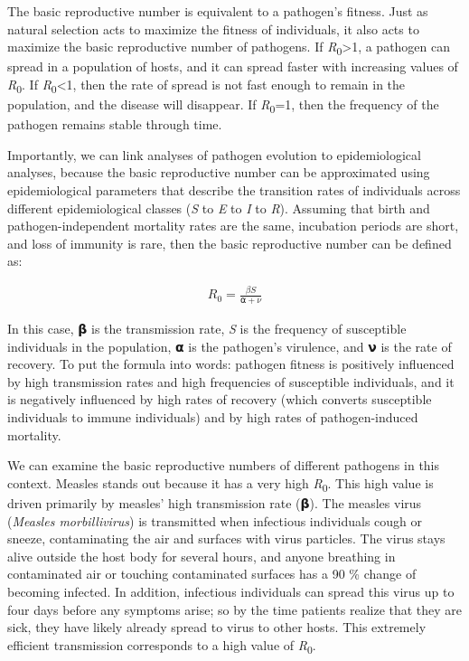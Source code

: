 \documentclass[
]{book}
\begin{document}
The basic reproductive number is equivalent to a pathogen's fitness. Just as natural selection acts to maximize the fitness of individuals, it also acts to maximize the basic reproductive number of pathogens. If \emph{R}\textsubscript{0}\textgreater1, a pathogen can spread in a population of hosts, and it can spread faster with increasing values of \emph{R}\textsubscript{0}. If \emph{R}\textsubscript{0}\textless1, then the rate of spread is not fast enough to remain in the population, and the disease will disappear. If \emph{R}\textsubscript{0}=1, then the frequency of the pathogen remains stable through time.

Importantly, we can link analyses of pathogen evolution to epidemiological analyses, because the basic reproductive number can be approximated using epidemiological parameters that describe the transition rates of individuals across different epidemiological classes (\emph{S} to \emph{E} to \emph{I} to \emph{R}). Assuming that birth and pathogen-independent mortality rates are the same, incubation periods are short, and loss of immunity is rare, then the basic reproductive number can be defined as:

\begin{align} 
R_0=\frac{βS}{⍺+ν} \label{eq:47}
\end{align}

In this case, 𝝱 is the transmission rate, \emph{S} is the frequency of susceptible individuals in the population, 𝝰 is the pathogen's virulence, and 𝝼 is the rate of recovery. To put the formula into words: pathogen fitness is positively influenced by high transmission rates and high frequencies of susceptible individuals, and it is negatively influenced by high rates of recovery (which converts susceptible individuals to immune individuals) and by high rates of pathogen-induced mortality.

We can examine the basic reproductive numbers of different pathogens in this context. Measles stands out because it has a very high \emph{R}\textsubscript{0}. This high value is driven primarily by measles' high transmission rate (𝝱). The measles virus (\emph{Measles morbillivirus}) is transmitted when infectious individuals cough or sneeze, contaminating the air and surfaces with virus particles. The virus stays alive outside the host body for several hours, and anyone breathing in contaminated air or touching contaminated surfaces has a 90 \% change of becoming infected. In addition, infectious individuals can spread this virus up to four days before any symptoms arise; so by the time patients realize that they are sick, they have likely already spread to virus to other hosts. This extremely efficient transmission corresponds to a high value of \emph{R}\textsubscript{0}.
\end{document}
